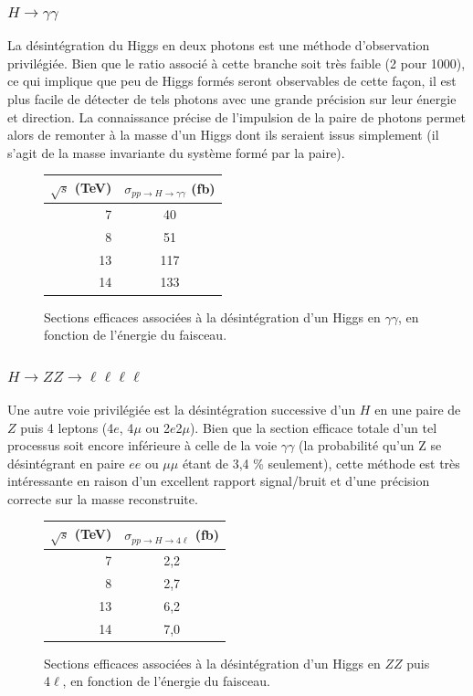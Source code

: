\documentclass[11pt]{article} %
\begin{document}
\subsubsection{$H \to \gamma \gamma$}

La désintégration du Higgs en deux photons est une méthode d'observation privilégiée. Bien que le ratio associé à cette branche soit très faible (2 pour 1000), ce qui implique que peu de Higgs formés seront observables de cette façon, il est plus facile de détecter de tels photons avec une grande précision sur leur énergie et direction. La connaissance précise de l'impulsion de la paire de photons permet alors de remonter à la masse d'un Higgs dont ils seraient issus simplement (il s'agit de la masse invariante du système formé par la paire).

\begin{figure}[H]
\centering
\begin{tabular}{|r|c|} 
   \hline
   $\sqrt{s}$ (TeV) & $\sigma_{pp \to H \to \gamma \gamma}$ (fb) \\
    \hline
   7 &  40\\
\hline
   8 & 51 \\
\hline
   13 & 117  \\
\hline
   14 & 133 \\
  \hline
\end{tabular}
\caption{Sections efficaces associées à la désintégration d'un Higgs en $\gamma \gamma$, en fonction de l'énergie du faisceau.}
\end{figure}

\subsubsection{$H \to ZZ \to \ell \ell \ell \ell$}

Une autre voie privilégiée est la désintégration successive d'un $H$ en une paire de $Z$ puis 4 leptons (4$e$, 4$\mu$ ou 2$e$2$\mu$). Bien que la section efficace totale d'un tel processus soit encore inférieure à celle de la voie $\gamma \gamma$ (la probabilité qu'un Z se désintégrant en paire $ee$ ou $\mu \mu$ étant de 3,4 \% seulement), cette méthode est très intéressante en raison d'un excellent rapport signal/bruit et d'une précision correcte sur la masse reconstruite.

\begin{figure}[H]
\centering
\begin{tabular}{|r|c|} 
   \hline
   $\sqrt{s}$ (TeV) & $\sigma_{pp \to H \to 4 \ell}$ (fb) \\
    \hline
   7 &  2,2\\
\hline
   8 & 2,7 \\
\hline
   13 & 6,2  \\
\hline
   14 & 7,0 \\
  \hline
\end{tabular}
\caption{Sections efficaces associées à la désintégration d'un Higgs en $ZZ$ puis 4$\ell$, en fonction de l'énergie du faisceau.}
\end{figure}
\end{document}
